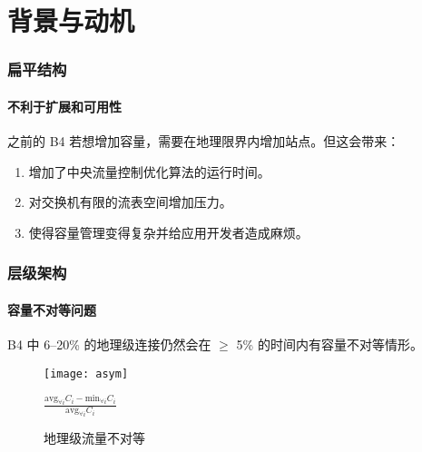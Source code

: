     \section{背景与动机}

    \begin{frame}
        \frametitle{扁平结构}
        \framesubtitle{不利于扩展和可用性}
        之前的 B4 若想增加容量，需要在地理限界内增加站点。但这会带来：
        \begin{enumerate}
            \item 增加了中央流量控制优化算法的运行时间。
            \item 对交换机有限的流表空间增加压力。
            \item 使得容量管理变得复杂并给应用开发者造成麻烦。
        \end{enumerate}
    \end{frame}

    \begin{frame}
        \frametitle{层级架构}
        \framesubtitle{容量不对等问题}
        B4 中 6--20\% 的地理级连接仍然会在 $\geq$ 5\% 的时间内有容量不对等情形。
        \begin{figure}[H]
            \centering
            \texttt{[image: asym]}

            $\frac{\text{avg}_{\forall i} C_i - \text{min}_{\forall i} C_i}{\text{avg}_{\forall i} C_i}$
            \caption{地理级流量不对等}\label{fig:asym}
        \end{figure}
    \end{frame}

